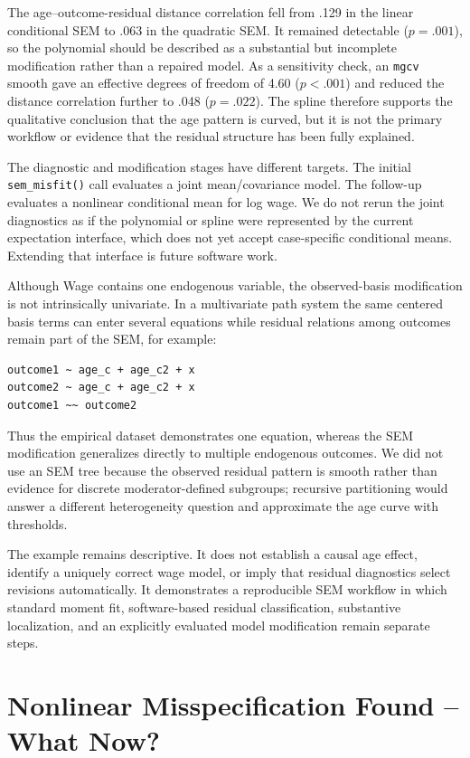 \documentclass[floatsintext,a4paper]{apa7} %
\begin{document}
	The age--outcome-residual distance correlation fell from .129 in the linear conditional SEM to .063 in the quadratic SEM. It remained detectable ($p = .001$), so the polynomial should be described as a substantial but incomplete modification rather than a repaired model. As a sensitivity check, an \texttt{mgcv} smooth gave an effective degrees of freedom of 4.60 ($p < .001$) and reduced the distance correlation further to .048 ($p = .022$). The spline therefore supports the qualitative conclusion that the age pattern is curved, but it is not the primary workflow or evidence that the residual structure has been fully explained.
	
	The diagnostic and modification stages have different targets. The initial \texttt{sem\_misfit()} call evaluates a joint mean/covariance model. The follow-up evaluates a nonlinear conditional mean for log wage. We do not rerun the joint diagnostics as if the polynomial or spline were represented by the current expectation interface, which does not yet accept case-specific conditional means. Extending that interface is future software work.
	
	Although Wage contains one endogenous variable, the observed-basis modification is not intrinsically univariate. In a multivariate path system the same centered basis terms can enter several equations while residual relations among outcomes remain part of the SEM, for example:
	
\begin{verbatim}
outcome1 ~ age_c + age_c2 + x
outcome2 ~ age_c + age_c2 + x
outcome1 ~~ outcome2
\end{verbatim}
	
	Thus the empirical dataset demonstrates one equation, whereas the SEM modification generalizes directly to multiple endogenous outcomes. We did not use an SEM tree because the observed residual pattern is smooth rather than evidence for discrete moderator-defined subgroups; recursive partitioning would answer a different heterogeneity question and approximate the age curve with thresholds.
	
	The example remains descriptive. It does not establish a causal age effect, identify a uniquely correct wage model, or imply that residual diagnostics select revisions automatically. It demonstrates a reproducible SEM workflow in which standard moment fit, software-based residual classification, substantive localization, and an explicitly evaluated model modification remain separate steps.
	
	
	\section{Nonlinear Misspecification Found -- What Now?}
	
\end{document}
